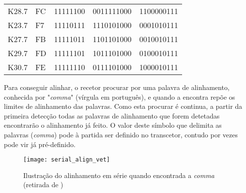 \begin{table}[h!]
{\begin{tabular}{@{}lllll@{}}
			K28.7                             & FC                                       & 11111100                                       & 0011111000                                          & 1100000111                                          \\
			K23.7                             & F7                                       & 11110111                                       & 1110101000                                          & 0001010111                                          \\
			K27.7                             & FB                                       & 11111011                                       & 1101101000                                          & 0010010111                                          \\
			K29.7                             & FD                                       & 11111101                                       & 1011101000                                          & 0100010111                                          \\
			K30.7                             & FE                                       & 11111110                                       & 0111101000                                          & 1000010111                                          \\ \bottomrule
		\end{tabular}%
	}
\end{table}

Para conseguir alinhar, o recetor procurar por uma palavra de alinhamento, conhecida por "\textit{comma}" (vírgula em português), e quando a encontra repõe os limites de alinhamento das palavras. Como esta procurar é continua, a partir da primeira detecção todas as palavras de alinhamento que forem detetadas encontrarão o alinhamento já feito. O valor deste símbolo que delimita as palavras (\textit{comma}) pode à partida ser definido no transcetor, contudo por vezes pode vir já pré-definido. 


\begin{figure}[h!]
	\begin{center}
		\leavevmode
		\texttt{[image: serial\_align\_vet]}
		\caption[Ilustração do alinhamento em série quando encontrada a \textit{comma}]{Ilustração do alinhamento em série quando encontrada a \textit{comma} (retirada de \cite{R011})}
		\label{fig:alinhamento_serie}
	\end{center}
\end{figure}

